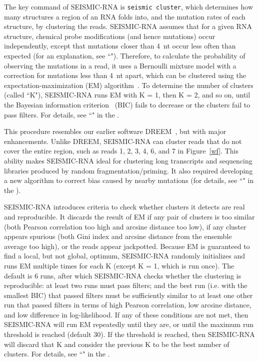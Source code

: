 \documentclass[11pt]{article}
\begin{document}
The key command of SEISMIC-RNA is \verb|seismic cluster|, which determines how many structures a region of an RNA folds into, and the mutation rates of each structure, by clustering the reads.
SEISMIC-RNA assumes that for a given RNA structure, chemical probe modifications (and hence mutations) occur independently, except that mutations closer than 4~nt occur less often than expected (for an explanation, see ``").
Therefore, to calculate the probability of observing the mutations in a read, it uses a Bernoulli mixture model with a correction for mutations less than 4~nt apart, which can be clustered using the expectation-maximization (EM) algorithm~\cite{Dempster1977}.
To determine the number of clusters (called ``K"), SEISMIC-RNA runs EM with K = 1, then K = 2, and so on, until the Bayesian information criterion~\cite{Schwarz1978} (BIC) fails to decrease or the clusters fail to pass filters.
For details, see ``" in the .

This procedure resembles our earlier software DREEM~\cite{Tomezsko2020}, but with major enhancements.
Unlike DREEM, SEISMIC-RNA can cluster reads that do not cover the entire region, such as reads 1, 2, 3, 4, 6, and 7 in Figure~\ref{wf}.
This ability makes SEISMIC-RNA ideal for clustering long transcripts and sequencing libraries produced by random fragmentation/priming.
It also required developing a new algorithm to correct bias caused by nearby mutations (for details, see ``" in the ).

SEISMIC-RNA introduces criteria to check whether clusters it detects are real and reproducible.
It discards the result of EM if any pair of clusters is too similar (both Pearson correlation too high and arcsine distance too low), if any cluster appears spurious (both Gini index and arcsine distance from the ensemble average too high), or the reads appear jackpotted.
Because EM is guaranteed to find a local, but not global, optimum, SEISMIC-RNA randomly initializes and runs EM multiple times for each K (except K = 1, which is run once).
The default is 6 runs, after which SEISMIC-RNA checks whether the clustering is reproducible: at least two runs must pass filters; and the best run (i.e. with the smallest BIC) that passed filters must be sufficiently similar to at least one other run that passed filters in terms of high Pearson correlation, low arcsine distance, and low difference in log-likelihood.
If any of these conditions are not met, then SEISMIC-RNA will run EM repeatedly until they are, or until the maximum run threshold is reached (default 30).
If the threshold is reached, then SEISMIC-RNA will discard that K and consider the previous K to be the best number of clusters.
For details, see ``" in the .
\end{document}
